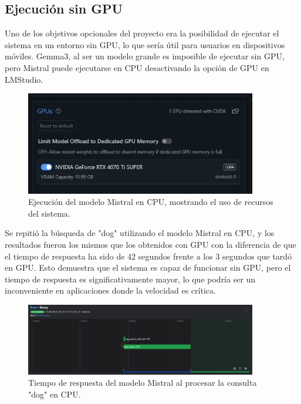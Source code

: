 \subsection{Ejecución sin GPU}
\label{sec:execution_without_gpu}
Uno de los objetivos opcionales del proyecto era la posibilidad de ejecutar el sistema en un entorno sin GPU, lo que sería útil para usuarios en dispositivos móviles.
Gemma3, al ser un modelo grande es imposible de ejecutar sin GPU, pero Mistral puede ejecutarse en CPU desactivando la opción de GPU en LMStudio.

\begin{figure}[H]
\centering
\includegraphics[width=0.9\textwidth]{archivos/no_gpu.png}
\caption[Ejecución de Mistral sin GPU]{Ejecución del modelo Mistral en CPU, mostrando el uso de recursos del sistema.}
\label{fig:no_gpu}
\end{figure}

Se repitió la búsqueda de "dog" utilizando el modelo Mistral en CPU, y los resultados fueron los mismos que los obtenidos con GPU con la diferencia de que el tiempo de respuesta ha sido de 42 segundos frente a los 3 segundos que tardó en GPU. Esto demuestra que el sistema es capaz de funcionar sin GPU, pero el tiempo de respuesta es significativamente mayor, lo que podría ser un inconveniente en aplicaciones donde la velocidad es crítica.
\begin{figure}[H]
\centering
\includegraphics[width=0.9\textwidth]{archivos/no_gpu_time.png}
\caption[Tiempo de respuesta de Mistral sin GPU]{Tiempo de respuesta del modelo Mistral al procesar la consulta "dog" en CPU.}
\label{fig:no_gpu_time}
\end{figure}
